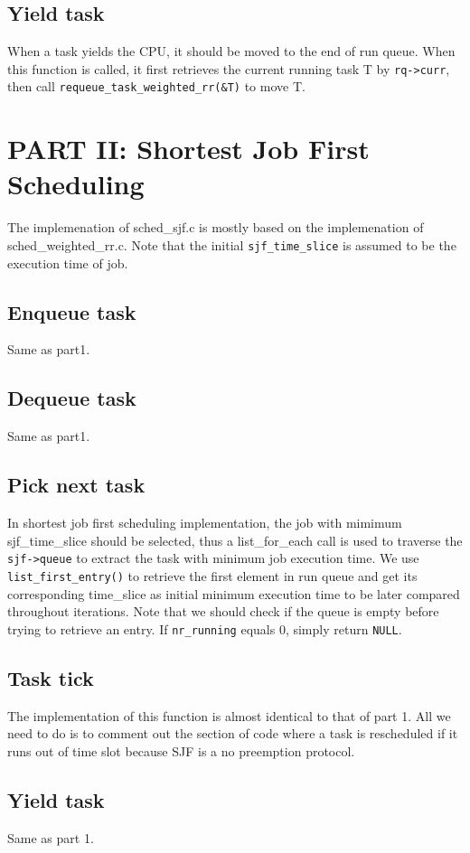 \documentclass[12pt]{article}
\begin{document}
\subsection*{Yield task}
	When a task yields the CPU, it should be moved to the end of run queue. When this function is called, it first retrieves the current running task T by \verb|rq->curr|, then call \verb|requeue_task_weighted_rr(&T)| to move T.

\section*{PART II: Shortest Job First Scheduling}
The implemenation of sched\_sjf.c is mostly based on the implemenation of sched\_weighted\_rr.c. Note that the initial \verb|sjf_time_slice| is assumed to be the execution time of job.
\subsection*{Enqueue task}
	Same as part1.
\subsection*{Dequeue task}
	Same as part1.
\subsection*{Pick next task}
  In shortest job first scheduling implementation, the job with mimimum sjf\_time\_slice should be selected, thus a list\_for\_each call is used to traverse the \verb|sjf->queue| to extract the task with minimum job execution time.
  We use \verb|list_first_entry()| to retrieve the first element in run queue and get its corresponding time\_slice as initial minimum execution time to be later compared throughout iterations.
  Note that we should check if the queue is empty before trying to retrieve an entry. If \verb|nr_running| equals 0, simply return \verb|NULL|.

\subsection*{Task tick}
  The implementation of this function is almost identical to that of part 1. All we need to do is to comment out the section of code where a task is rescheduled if it runs out of time slot because SJF is a no preemption protocol.

\subsection*{Yield task}
  Same as part 1.
\end{document}
